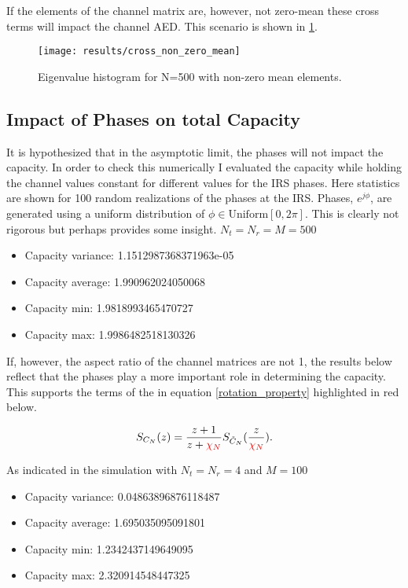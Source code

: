 \documentclass[12pt,a4paper]{report}
\begin{document}
If the elements of the channel matrix are, however, not zero-mean these cross terms will impact the channel AED. 
This scenario is shown in \ref{cross_non_zero_mean}.

\begin{figure}[H]
	\texttt{[image: results/cross\_non\_zero\_mean]}
\caption{Eigenvalue histogram for N=500 with non-zero mean elements.}
\label{cross_non_zero_mean}
\end{figure}

\subsection{Impact of Phases on total Capacity}
It is hypothesized that in the asymptotic limit, the phases will not impact the capacity. In order to check this numerically I evaluated the capacity while holding the channel values constant for different values for the IRS phases. Here statistics are shown for 100 random realizations of the phases at the IRS. 
Phases, $e^{j\phi}$, are generated using a uniform distribution of $\phi \in \text{Uniform}[0,2\pi]$. This is clearly not rigorous but perhaps provides some insight. 
$N_t = N_r = M = 500$
\begin{itemize}
\item
Capacity variance:
 1.1512987368371963e-05
 \item
Capacity average:
 1.990962024050068
 \item
Capacity min:
 1.9818993465470727
 \item
Capacity max:
 1.9986482518130326
\end{itemize}

If, however, the aspect ratio of the channel matrices are not 1, the results below reflect that the phases play a more important role in determining the capacity. This supports the terms of the in equation \eqref{rotation_property} highlighted in red below. 

\begin{equation}\label{rotation_property}
S_{C_N}(z) = \frac{z+1}{z+ \textcolor{red}{\chi_N}} S_{\tilde{C}_N}(\frac{z}{\textcolor{red}{\chi_N}}).
\end{equation}

As indicated in the simulation with $N_t = N_r = 4$ and $M = 100$

\begin{itemize}
\item 
Capacity variance:
 0.04863896876118487
 \item
Capacity average:
 1.695035095091801
 \item
Capacity min:
 1.2342437149649095
 \item
Capacity max:
 2.320914548447325
\end{itemize}






	

	
	




\end{document}
